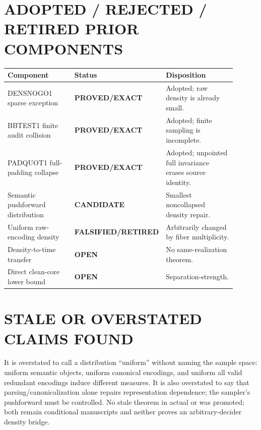 \documentclass[11pt]{article}
\newcommand{\EXACT}{\textbf{PROVED/EXACT}}
\newcommand{\CAND}{\textbf{CANDIDATE}}
\newcommand{\OPEN}{\textbf{OPEN}}
\newcommand{\RET}{\textbf{FALSIFIED/RETIRED}}
\begin{document}
\section{ADOPTED / REJECTED / RETIRED PRIOR COMPONENTS}
\begin{longtable}{p{0.34\linewidth}p{0.18\linewidth}p{0.38\linewidth}}
\toprule Component & Status & Disposition\\ \midrule
DENSNOGO1 sparse exception & \EXACT & Adopted; raw density is already small.\\
BBTEST1 finite audit collision & \EXACT & Adopted; finite sampling is incomplete.\\
PADQUOT1 full-padding collapse & \EXACT & Adopted; unpointed full invariance erases source identity.\\
Semantic pushforward distribution & \CAND & Smallest noncollapsed density repair.\\
Uniform raw-encoding density & \RET & Arbitrarily changed by fiber multiplicity.\\
Density-to-time transfer & \OPEN & No same-realization theorem.\\
Direct clean-core lower bound & \OPEN & Separation-strength.\\
\bottomrule
\end{longtable}

\section{STALE OR OVERSTATED CLAIMS FOUND}
It is overstated to call a distribution ``uniform'' without naming the sample
space: uniform semantic objects, uniform canonical encodings, and uniform all
valid redundant encodings induce different measures. It is also overstated
to say that parsing/canonicalization alone repairs representation dependence;
the sampler's pushforward must be controlled. No stale theorem in actual
 or  was promoted; both remain conditional
manuscripts and neither proves an arbitrary-decider density bridge.
\end{document}
